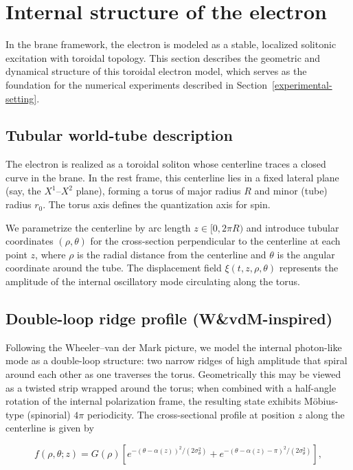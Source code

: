 \section{Internal structure of the electron}
\label{sec:internal-structure-of-the-electron}

In the brane framework, the electron is modeled as a stable, localized solitonic
excitation with toroidal topology. This section describes the geometric and
dynamical structure of this toroidal electron model, which serves as the
foundation for the numerical experiments described in
Section~\ref{experimental-setting}.

\subsection{Tubular world-tube description}
\label{subsec:tubular-electron}

The electron is realized as a toroidal soliton whose centerline traces a closed
curve in the brane. In the rest frame, this centerline lies in a fixed lateral
plane (say, the $X^1$--$X^2$ plane), forming a torus of major radius $R$ and
minor (tube) radius $r_0$. The torus axis defines the quantization axis for
spin.

We parametrize the centerline by arc length $z \in [0, 2\pi R)$ and introduce
tubular coordinates $(\rho, \theta)$ for the cross-section perpendicular to the
centerline at each point $z$, where $\rho$ is the radial distance from the
centerline and $\theta$ is the angular coordinate around the tube. The
displacement field $\xi(t,z,\rho,\theta)$ represents the amplitude of the
internal oscillatory mode circulating along the torus.

\subsection{Double-loop ridge profile (W\&vdM-inspired)}

Following the Wheeler--van der Mark picture, we model the internal photon-like
mode as a double-loop structure: two narrow ridges of high amplitude that spiral
around each other as one traverses the torus. Geometrically this may be viewed as a
twisted strip wrapped around the torus; when combined with a half-angle rotation of
the internal polarization frame, the resulting state exhibits Möbius-type (spinorial) $4\pi$
periodicity. The cross-sectional profile at
position $z$ along the centerline is given by

\begin{equation}
f(\rho,\theta;z) = G(\rho) \left[
e^{-(\theta-\alpha(z))^2/(2\sigma_\theta^2)}
+ e^{-(\theta-\alpha(z)-\pi)^2/(2\sigma_\theta^2)}
\right],
\label{eq:double-tunnel-profile}
\end{equation}

